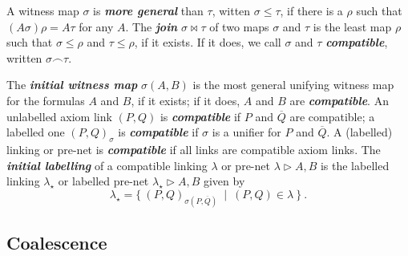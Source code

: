 \documentclass{article}
\theoremstyle{definition}
\theoremstyle{plain}
\newcommand\defn[1]{\textit{\textbf{#1}}}
\newcommand\floor[1]{\lfloor#1\rfloor}
\newcommand\+{+}
\renewcommand\*{\times}
\newcommand\dual[1]{\overline{#1}}
\newcommand\net[3]{#1\triangleright #2,#3}
\newcommand\join\bowtie
\newcommand\comp\frown
\newcommand\clink[3][\sigma]{(#2,#3)_{#1}}
\begin{document}
A witness map $\sigma$ is \defn{more general} than $\tau$, witten $\sigma\leq\tau$, if there is a $\rho$ such that $(A\sigma)\rho = A\tau$ for any $A$. The \defn{join} $\sigma\join\tau$ of two maps $\sigma$ and $\tau$ is the least map $\rho$ such that $\sigma\leq\rho$ and $\tau\leq\rho$, if it exists. If it does, we call $\sigma$ and $\tau$ \defn{compatible}, written $\sigma\comp\tau$. 

The \defn{initial witness map} $\sigma(A,B)$ is the most general unifying witness map for the formulas $A$ and $B$, if it exists; if it does, $A$ and $B$ are \defn{compatible}. An unlabelled axiom link $(P,Q)$ is \defn{compatible} if $P$ and $\dual Q$ are compatible; a labelled one $\clink PQ$ is \defn{compatible} if $\sigma$ is a unifier for $P$ and $\dual Q$. A (labelled) linking or pre-net is \defn{compatible} if all links are compatible axiom links. The \defn{initial labelling} of a compatible linking $\lambda$ or pre-net $\net\lambda AB$ is the labelled linking $\lambda_\star$ or labelled pre-net $\net{\lambda_\star}AB$ given by
\[
	\lambda_\star = \{~\clink[\sigma(P,\dual Q)]PQ~\mid~(P,Q)\in\lambda~\}~.
\]



\subsection{Coalescence}

\end{document}
